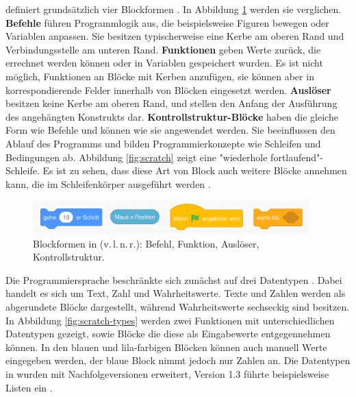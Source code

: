 \Scratch{} definiert grundsätzlich vier Blockformen \parencite{maloneyScratchProgramming2010}. In Abbildung \ref{fig:scratch-blocks} werden sie verglichen. \textbf{Befehle} führen Programmlogik aus, die beispielsweise Figuren bewegen oder Variablen anpassen. Sie besitzen typischerweise eine Kerbe am oberen Rand und Verbindungsstelle am unteren Rand. \textbf{Funktionen} geben Werte zurück, die errechnet werden können oder in Variablen gespeichert wurden. Es ist nicht möglich, Funktionen an Blöcke mit Kerben anzufügen, sie können aber in korrespondierende Felder innerhalb von Blöcken eingesetzt werden. \textbf{Auslöser} besitzen keine Kerbe am oberen Rand, und stellen den Anfang der Ausführung des angehängten Konstrukts dar. \textbf{Kontrollstruktur-Blöcke} haben die gleiche Form wie Befehle und können wie sie angewendet werden. Sie beeinflussen den Ablauf des Programms und bilden Programmierkonzepte wie Schleifen und Bedingungen ab. Abbildung \ref{fig:scratch} zeigt eine "wiederhole fortlaufend"-Schleife. Es ist zu sehen, dass diese Art von Block auch weitere Blöcke annehmen kann, die im Schleifenkörper ausgeführt werden \parencite{maloneyScratchProgramming2010}.

\begin{figure}[!ht]
  \begin{center}
    \includegraphics[width=0.95\textwidth]{assets/scratch-blocks.png}
  \end{center}
  \caption[Blockformen in \Scratch{}]{Blockformen in \Scratch{} (v.\,l.\,n.\,r.): Befehl, Funktion, Auslöser, Kontrollstruktur.}
  \label{fig:scratch-blocks}
\end{figure}

Die Programmiersprache \Scratch{} beschränkte sich zunächst auf drei Datentypen \parencite{maloneyScratchProgramming2010}. Dabei handelt es sich um Text, Zahl und Wahrheitswerte. Texte und Zahlen werden als abgerundete Blöcke dargestellt, während Wahrheitswerte sechseckig sind besitzen. In Abbildung \ref{fig:scratch-types} werden zwei Funktionen mit unterschiedlichen Datentypen gezeigt, sowie Blöcke die diese als Eingabewerte entgegennehmen können. In den blauen und lila-farbigen Blöcken können auch manuell Werte eingegeben werden, der blaue Block nimmt jedoch nur Zahlen an. Die Datentypen in \Scratch{} wurden mit Nachfolgeversionen erweitert, Version 1.3 führte beispielsweise Listen ein \parencite{harveyBringingNo2010}.


